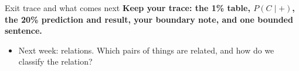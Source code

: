 \documentclass[aspectratio=169,10pt]{beamer}
\begin{document}
\begin{frame}{Exit trace and what comes next}
\Large\centering
\textbf{Keep your trace: the 1\% table, $P(C\mid +)$, the 20\% prediction and result, your boundary note, and one bounded sentence.}
\normalsize\vspace{4mm}
\begin{itemize}
\item Next week: relations. Which pairs of things are related, and how do we classify the relation?
\end{itemize}
\end{frame}
\end{document}
